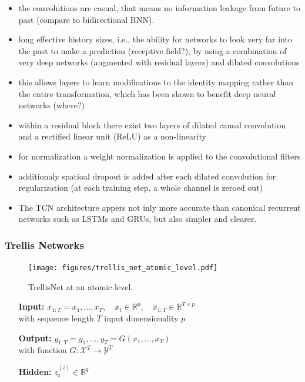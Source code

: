 \documentclass{scrartcl}
\begin{document}
\begin{itemize}
\item the convolutions are casual, that means no information leakage from future to past (compare to bidirectional RNN).
\item long effective history sizes, i.e., the ability for networks to look very far into the past to make a prediction (receptive field?), by using a combination of very deep networks (augmented with residual layers) and dilated convolutions 
\item this allows layers to learn modifications to the identity mapping rather than the entire transformation, which has been shown to benefit deep neural networks (where?)
\item within a residual block there exist two layers of dilated causal convolution and a rectified linear unit (ReLU) \cite[Nair2010]{Nair2010} as a non-linearity
\item for normalization a weight normalization \cite[Salimans2016]{Salimans2016} is applied to the convolutional filters 
\item additionaly spatioal dropout \cite[Srivastava2014]{Srivastava2014} is added after each dilated convolution for regularization (at each training step, a whole channel is zeroed out)
\item The TCN architecture appers not inly more accurate than canonical recurrent networks such as LSTMs and GRUs, but also simpler and clearer.
\end{itemize}


\subsubsection{Trellis Networks}
\begin{figure}[htbp]
\centering
\texttt{[image: figures/trellis\_net\_atomic\_level.pdf]}
\caption{TrellisNet at an atomic level.}
\label{fig:TrellisNetAtomic}
\end{figure}    

\begin{itemize}
\item[\textbf{Input:}] $x_{1:T} = x_1, \dots, x_T, \quad x_t \in \mathbb R^p, \quad x_{1:T} \in \mathbb R^{T \times p}$ \vspace{0.5em}\\ 
with sequence length  $T$  input dimensionality  $p$
\item[\textbf{Output:}] $y_{1:T} = y_1, \dots, y_T = G(x_1, \dots, x_T)$ \vspace{0.5em} \\
with function $G: \mathcal X^T \rightarrow \mathcal Y^T$ 
\item[\textbf{Hidden:}] $z_t^{(i)} \in \mathbb R^q$
\end{itemize}
\end{document}
